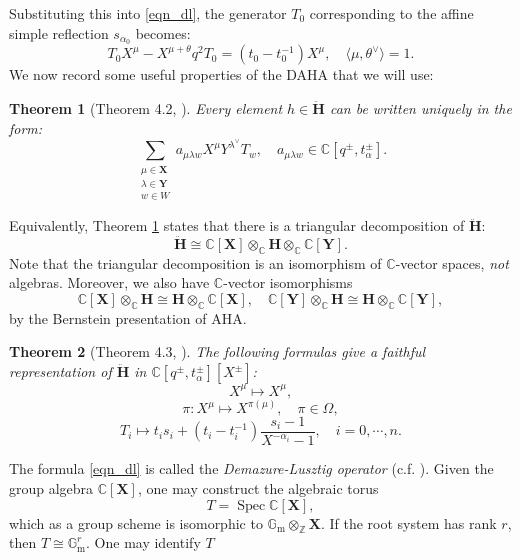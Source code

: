 \documentclass[a4paper]{report}
\newtheorem{theorem}{Theorem}
\theoremstyle{theorem}
\theoremstyle{definition}
\theoremstyle{remark}
\theoremstyle{proposition}
\theoremstyle{conjecture}
\theoremstyle{lemma}
\theoremstyle{corollary}
\theoremstyle{exercise}
\theoremstyle{example}
\newcommand{\C}{\mathbb{C}}
\newcommand{\on}{\operatorname}
\newcommand{\spec}{\on{Spec}}
\begin{document}
  Substituting this into \eqref{eqn_dl}, the generator $T_0$ corresponding to 
  the affine simple reflection $s_{\alpha_0}$ becomes:
  $$T_0X^\mu - X^{\mu+\theta}q^2T_0 = (t_0-t_0^{-1}) X^\mu,\quad \langle \mu,\theta^\vee\rangle = 1.$$
  We now record some useful properties of the DAHA that we will
  use:
  \begin{theorem}[Theorem 4.2, \cite{kir97}]\label{thm_pbw_thm}
      Every element $h\in \mathbf{\ddot{\mathbf{H}}}$ can be written uniquely in the form:
      $$\displaystyle\sum_{\substack{\mu \in \mathbf{X}\\ \lambda \in \mathbf{Y}\\w \in W}} a_{\mu\lambda w} X^\mu Y^{\lambda^\vee} T_w, \quad a_{\mu\lambda w} \in \C[q^\pm,t_\alpha^\pm].$$
  \end{theorem}
  Equivalently, Theorem \ref{thm_pbw_thm} states that there is a 
  triangular decomposition of $\mathbf{\ddot{\mathbf{H}}}$:
  \begin{equation}\label{eqn_tri_decomp}
      \mathbf{\ddot{\mathbf{H}}} \cong \C[\mathbf{X}] \otimes_\C \mathbf{H} \otimes_\C \C[\mathbf{Y}].
  \end{equation}
  Note that the triangular decomposition is an isomorphism of $\C$-vector spaces, 
  \emph{not} algebras.
  Moreover, we also have $\C$-vector isomorphisms 
  $$\C[\mathbf{X}] \otimes_\C \mathbf{H} \cong \mathbf{H} \otimes_\C \C[\mathbf{X}],\quad \C[\mathbf{Y}] \otimes_\C \mathbf{H} \cong \mathbf{H} \otimes_\C \C[\mathbf{Y}],$$
  by the Bernstein presentation of AHA. 
  \begin{theorem}[Theorem 4.3, \cite{kir97}]\label{thm_demazure_lusztig}
      The following formulas give a faithful representation of $\mathbf{\ddot{\mathbf{H}}}$
      in $\C[q^\pm,t_\alpha^\pm][X^\pm]$: 
      $$X^\mu \longmapsto X^\mu,$$
      $$\pi : X^\mu \longmapsto X^{\pi(\mu)},\quad \pi\in\Omega,$$
      \begin{equation}\label{eqn_dl}
          T_i \longmapsto t_is_i + (t_i-t_i^{-1})\frac{s_i-1}{X^{-\alpha_i}-1},\quad i=0,\cdots,n.
      \end{equation}
  \end{theorem}
  The formula \eqref{eqn_dl} is called the
  \emph{Demazure-Lusztig operator} (c.f. \cite[(6.1)]{beg00}). 
  Given the group algebra $\C[\mathbf{X}]$, one may construct the algebraic
  torus 
  $$T = \spec \C[\mathbf{X}],$$
  which as a group scheme is isomorphic to 
  $\mathbb{G}_{\on{m}} \otimes_{\mathbb{Z}} \mathbf{X}$. If the root system
  has rank $r$, then $T \cong \mathbb{G}_{\on{m}}^r$. One may identify $T$
\end{document}
